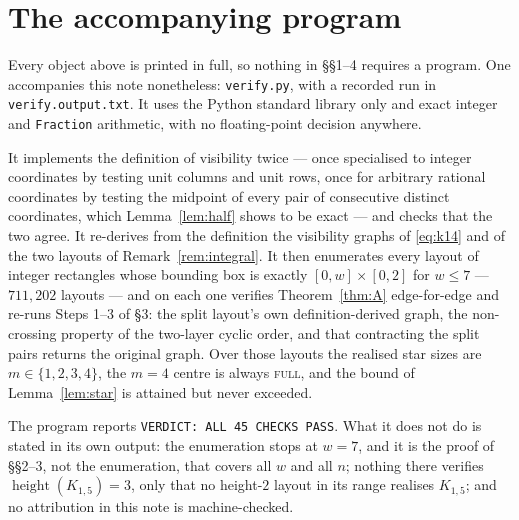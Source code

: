 \documentclass[11pt]{amsart}
\theoremstyle{remark}
\newcommand{\height}{\operatorname{height}}
\begin{document}
\section{The accompanying program}

Every object above is printed in full, so nothing in \S\S1--4 requires a program. One
accompanies this note nonetheless: \texttt{verify.py}, with a recorded run in
\texttt{verify.output.txt}. It uses the Python standard library only and exact integer
and \texttt{Fraction} arithmetic, with no floating-point decision anywhere.

It implements the definition of visibility twice --- once specialised to integer
coordinates by testing unit columns and unit rows, once for arbitrary rational
coordinates by testing the midpoint of every pair of consecutive distinct coordinates,
which Lemma~\ref{lem:half} shows to be exact --- and checks that the two agree. It
re-derives from the definition the visibility graphs of \eqref{eq:k14} and of the two
layouts of Remark~\ref{rem:integral}. It then enumerates every layout of integer
rectangles whose bounding box is exactly $[0,w]\times[0,2]$ for $w\le7$ ---
$711{,}202$ layouts --- and on each one verifies Theorem~\ref{thm:A} edge-for-edge and
re-runs Steps 1--3 of \S3: the split layout's own definition-derived graph, the
non-crossing property of the two-layer cyclic order, and that contracting the split
pairs returns the original graph. Over those layouts the realised star sizes are
$m\in\{1,2,3,4\}$, the $m=4$ centre is always \textsc{full}, and the bound of
Lemma~\ref{lem:star} is attained but never exceeded.

The program reports \texttt{VERDICT: ALL 45 CHECKS PASS}. What it does not do is stated
in its own output: the enumeration stops at $w=7$, and it is the proof of \S\S2--3, not
the enumeration, that covers all $w$ and all $n$; nothing there verifies
$\height(K_{1,5})=3$, only that no height-$2$ layout in its range realises $K_{1,5}$;
and no
attribution in this note is machine-checked.
\end{document}
